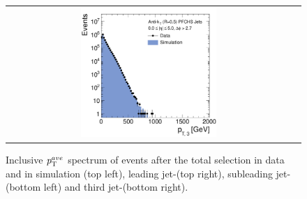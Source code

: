\begin{figure}[!tp]
\begin{tabular}{cc}
                \includegraphics[width=0.49\textwidth]{figures/Jet3Pt__AfterAsymmHistos.pdf}

  \end{tabular}
  \caption{Inclusive $p_{\text{T}}^{ave}$ spectrum of events after the total selection in data and in simulation (top left), leading jet-\pt (top right), subleading jet-\pt (bottom left) and third jet-\pt (bottom right).}
  \label{fig:ptave_spec}
\end{figure}

